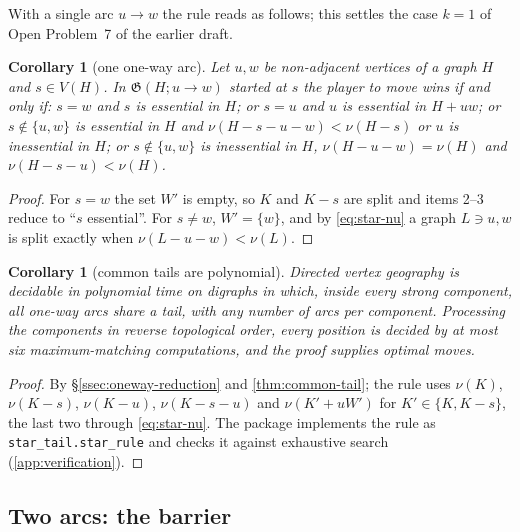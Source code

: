 \documentclass[11pt]{amsart}
\theoremstyle{plain}
\newtheorem{corollary}[theorem]{Corollary}
\theoremstyle{definition}
\theoremstyle{remark}
\numberwithin{equation}{section}
\newcommand{\code}[1]{{\ttfamily\nolinkurl{#1}}}
\newcommand{\game}{\mathfrak{G}}          %
\begin{document}
With a single arc $u\to w$ the rule reads as follows; this settles the case $k=1$ of Open Problem~7 of the earlier draft.

\begin{corollary}[one one-way arc]\label{cor:one-arc}
Let $u,w$ be non-adjacent vertices of a graph $H$ and $s\in V(H)$. In $\game(H;u\to w)$ started at $s$ the player to move wins if and only if: $s=w$ and $s$ is essential in $H$; or $s=u$ and $u$ is essential in $H+uw$; or $s\notin\{u,w\}$ is essential in $H$ and $\nu(H-s-u-w)<\nu(H-s)$ or $u$ is inessential in $H$; or $s\notin\{u,w\}$ is inessential in $H$, $\nu(H-u-w)=\nu(H)$ and $\nu(H-s-u)<\nu(H)$.
\end{corollary}
\begin{proof}
For $s=w$ the set $W'$ is empty, so $K$ and $K-s$ are split and items 2--3 reduce to ``$s$ essential''. For $s\neq w$, $W'=\{w\}$, and by \eqref{eq:star-nu} a graph $L\ni u,w$ is split exactly when $\nu(L-u-w)<\nu(L)$.
\end{proof}

\begin{corollary}[common tails are polynomial]\label{cor:star-dvg}
Directed vertex geography is decidable in polynomial time on digraphs in which, inside every strong component, all one-way arcs share a tail, with any number of arcs per component. Processing the components in reverse topological order, every position is decided by at most six maximum-matching computations, and the proof supplies optimal moves.
\end{corollary}
\begin{proof}
By \S\ref{ssec:oneway-reduction} and \cref{thm:common-tail}; the rule uses $\nu(K)$, $\nu(K-s)$, $\nu(K-u)$, $\nu(K-s-u)$ and $\nu(K'+uW')$ for $K'\in\{K,K-s\}$, the last two through \eqref{eq:star-nu}. The package implements the rule as \code{star_tail.star_rule} and checks it against exhaustive search (\cref{app:verification}).
\end{proof}

\subsection{Two arcs: the barrier}
\end{document}
